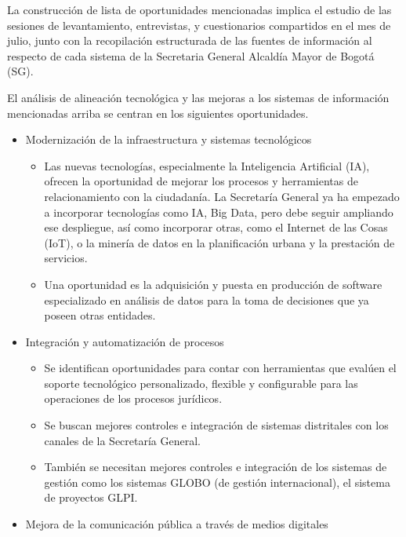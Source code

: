 \documentclass[
	a4paper, %
	12pt, %
]{include/CSSullivanBusinessReport}
\def\tightlist{}
\begin{document}
La construcción de lista de oportunidades mencionadas implica el estudio
de las sesiones de levantamiento, entrevistas, y cuestionarios
compartidos en el mes de julio, junto con la recopilación estructurada
de las fuentes de información al respecto de cada sistema de la
Secretaria General Alcaldía Mayor de Bogotá (SG).

El análisis de alineación tecnológica y las mejoras a los sistemas de
información mencionadas arriba se centran en los siguientes
oportunidades.

\begin{itemize}
\tightlist
\item
  Modernización de la infraestructura y sistemas tecnológicos

  \begin{itemize}
  \tightlist
  \item
    Las nuevas tecnologías, especialmente la Inteligencia Artificial
    (IA), ofrecen la oportunidad de mejorar los procesos y herramientas
    de relacionamiento con la ciudadanía. La Secretaría General ya ha
    empezado a incorporar tecnologías como IA, Big Data, pero debe
    seguir ampliando ese despliegue, así como incorporar otras, como el
    Internet de las Cosas (IoT), o la minería de datos en la
    planificación urbana y la prestación de servicios.
  \item
    Una oportunidad es la adquisición y puesta en producción de software
    especializado en análisis de datos para la toma de decisiones que ya
    poseen otras entidades.
  \end{itemize}
\item
  Integración y automatización de procesos

  \begin{itemize}
  \tightlist
  \item
    Se identifican oportunidades para contar con herramientas que
    evalúen el soporte tecnológico personalizado, flexible y
    configurable para las operaciones de los procesos jurídicos.
  \item
    Se buscan mejores controles e integración de sistemas distritales
    con los canales de la Secretaría General.
  \item
    También se necesitan mejores controles e integración de los sistemas
    de gestión como los sistemas GLOBO (de gestión internacional), el
    sistema de proyectos GLPI.
  \end{itemize}
\item
  Mejora de la comunicación pública a través de medios digitales


\end{itemize}
\end{document}

